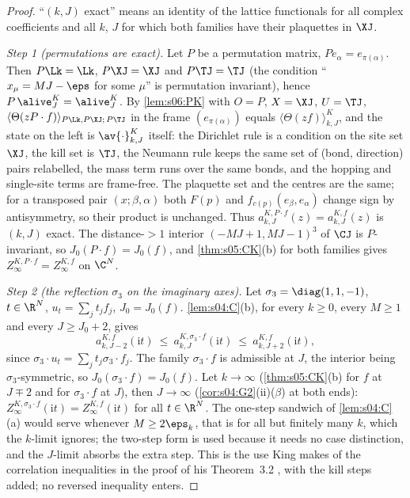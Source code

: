 \begin{proof}
``$(k,J)$ exact'' means an identity of the lattice functionals for all complex coefficients and all $k$, $J$ for which both families have their plaquettes in $\XJ$.

\emph{Step 1 (permutations are exact).} Let $P$ be a permutation matrix, $Pe_\alpha=e_{\pi(\alpha)}$. Then $P\Lk=\Lk$, $P\XJ=\XJ$ and $P\TJ=\TJ$ (the condition ``$x_\mu=MJ-\eps$ for some $\mu$'' is permutation invariant), hence $P\,\alive^K_J=\alive^K_J$. By \cref{lem:s06:PK} with $O=P$, $X=\XJ$, $U=\TJ$, $\langle\Theta(zP\cdot f)\rangle_{P\Lk,P\XJ;\,P\TJ}$ in the frame $(e_{\pi(\alpha)})$ equals $\langle\Theta(zf)\rangle^K_{k,J}$, and the state on the left is $\av{\cdot}^K_{k,J}$ itself: the Dirichlet rule is a condition on the site set $\XJ$, the kill set is $\TJ$, the Neumann rule keeps the same set of (bond, direction) pairs relabelled, the mass term runs over the same bonds, and the hopping and single-site terms are frame-free. The plaquette set and the centres are the same; for a transposed pair $(x;\beta,\alpha)$ both $F(p)$ and $f_{c(p)}(e_\beta,e_\alpha)$ change sign by antisymmetry, so their product is unchanged. Thus $a^{K,P\cdot f}_{k,J}(z)=a^{K,f}_{k,J}(z)$ is $(k,J)$ exact. The distance-$>1$ interior $(-MJ+1,MJ-1)^3$ of $\CJ$ is $P$-invariant, so $J_0(P\cdot f)=J_0(f)$, and \cref{thm:s05:CK}(b) for both families gives $Z^{K,P\cdot f}_\infty=Z^{K,f}_\infty$ on $\C^N$.

\emph{Step 2 (the reflection $\sigma_3$ on the imaginary axes).} Let $\sigma_3=\diag(1,1,-1)$, $t\in\R^N$, $u_t=\sum_jt_jf_j$, $J_0=J_0(f)$. \cref{lem:s04:C}(b), for every $k\ge0$, every $M\ge1$ and every $J\ge J_0+2$, gives
\[
a^{K,f}_{k,J-2}(\mathrm it)\ \le\ a^{K,\sigma_3\cdot f}_{k,J}(\mathrm it)\ \le\ a^{K,f}_{k,J+2}(\mathrm it),
\]
since $\sigma_3\cdot u_t=\sum_jt_j\sigma_3\cdot f_j$. The family $\sigma_3\cdot f$ is admissible at $J$, the interior being $\sigma_3$-symmetric, so $J_0(\sigma_3\cdot f)=J_0(f)$. Let $k\to\infty$ (\cref{thm:s05:CK}(b) for $f$ at $J\mp2$ and for $\sigma_3\cdot f$ at $J$), then $J\to\infty$ (\cref{cor:s04:G2}(ii)($\beta$) at both ends): $Z^{K,\sigma_3\cdot f}_\infty(\mathrm it)=Z^{K,f}_\infty(\mathrm it)$ for all $t\in\R^N$. The one-step sandwich of \cref{lem:s04:C}(a) would serve whenever $M\ge2\eps_k$, that is for all but finitely many $k$, which the $k$-limit ignores; the two-step form is used because it needs no case distinction, and the $J$-limit absorbs the extra step. This is the use King makes of the correlation inequalities in the proof of his Theorem~3.2 \cite{K2}, with the kill steps added; no reversed inequality enters.


\end{proof}
